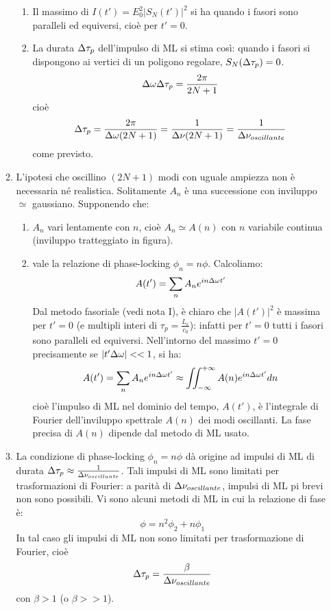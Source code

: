\begin{enumerate}
\begin{enumerate}
\begin{enumerate}
\item Il massimo di $I(t') = E_0^2 \left|S_N(t')\right|^2$ si ha quando i fasori sono paralleli ed equiversi, cioè per $t'=0$.
\item La durata $\Delta\tau_p$ dell'impulso di ML si stima così: quando i fasori si dispongono ai vertici di un poligono regolare, $S_N(\Delta\tau_p) = 0$.
\begin{equation*}
\Delta\omega \Delta\tau_p = \frac{2\pi}{2N+1}
\end{equation*}
cioè
\begin{equation*}
\Delta\tau_p = \frac{2\pi}{\Delta\omega (2N+1)} = \frac{1}{\Delta\nu(2N+1)} = \frac{1}{\Delta\nu_{oscillante}}
\end{equation*}
come previsto.
\end{enumerate}

\item L'ipotesi che oscillino $(2N+1)$ modi con uguale ampiezza non è necessaria né realistica. Solitamente $A_n$ è una successione con inviluppo $\simeq$ gaussiano.
Supponendo che:
\begin{enumerate}
\item $A_n$ vari lentamente con $n$, cioè $A_n \simeq A(n)$ con $n$ variabile continua (inviluppo tratteggiato in figura).
\item vale la relazione di phase-locking $\phi_n = n\phi$.
Calcoliamo:
\begin{equation*}
A(t') = \sum_n A_n e^{in\Delta\omega t'}
\end{equation*}
Dal metodo fasoriale (vedi nota I), è chiaro che $|A(t')|^2$ è massima per $t'=0$ (e multipli interi di $\tau_p = \frac{L_e}{c_0}$): infatti per $t'=0$ tutti i fasori sono paralleli ed equiversi.
Nell'intorno del massimo $t'=0$ precisamente se $|t'\Delta\omega| << 1$, si ha:
\begin{equation*}
A(t') = \sum_n A_n e^{in\Delta\omega t'} \approx \iint_{-\infty}^{+\infty} A(n) e^{in\Delta\omega t'} dn
\end{equation*}
cioè l'impulso di ML nel dominio del tempo, $A(t')$, è l'integrale di Fourier dell'inviluppo spettrale $A(n)$ dei modi oscillanti. La fase precisa di $A(n)$ dipende dal metodo di ML usato.
\end{enumerate}

\item La condizione di phase-locking $\phi_n=n\phi$ dà origine ad impulsi di ML di durata $\Delta\tau_p \approx \frac{1}{\Delta\nu_{oscillante}}$.
Tali impulsi di ML sono limitati per trasformazioni di Fourier: a parità di $\Delta\nu_{oscillante}$, impulsi di ML pi brevi non sono possibili. Vi sono alcuni metodi di ML in cui la relazione di fase è:
\begin{equation*}
\phi = n^2\phi_2 + n \phi_1
\end{equation*}
In tal caso gli impulsi di ML non sono limitati per trasformazione di Fourier, cioè
\begin{equation*}
\Delta\tau_p = \frac{\beta}{\Delta\nu_{oscillante}}
\end{equation*}
con $\beta>1$ (o $\beta >> 1$).


\end{enumerate}
\end{enumerate}

